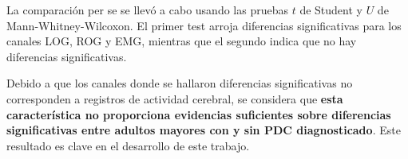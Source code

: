 La comparaci\'on per se se llev\'o a cabo usando las pruebas %
$t$ de Student y $U$ de Mann-Whitney-Wilcoxon.
El primer test arroja diferencias significativas para los canales LOG, ROG y EMG, mientras que
el segundo indica que no hay diferencias significativas. 

Debido a que los canales
donde se hallaron diferencias significativas no corresponden a registros de actividad
cerebral, se considera que \textbf{esta caracter\'istica no proporciona evidencias
suficientes sobre diferencias significativas entre adultos mayores con y sin PDC diagnosticado}.
Este resultado es clave en el desarrollo de este trabajo.

